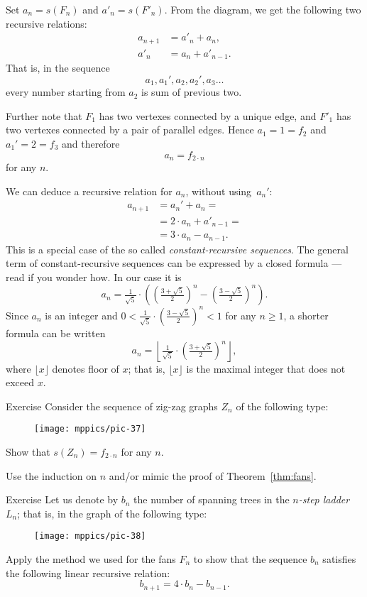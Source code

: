 Set $a_n=s(F_n)$ and $a'_n=s(F'_n)$.
From the diagram, we get the following two recursive relations:
\begin{align*}
a_{n+1}&=a'_n+a_n,
\\
a'_n&=a_n+a'_{n-1}.
\end{align*}
That is, in the sequence 
\[a_1,a_1',a_2,a_2',a_3\dots\]
every number starting from $a_2$ is sum of previous two.

Further note that $F_1$ has two vertexes connected by a unique edge,
and  $F'_1$ has two vertexes connected by a pair of parallel edges.
Hence $a_1=1=f_2$ and $a_1'=2=f_3$ and therefore 
\[a_n=f_{2\cdot n}\]
for any $n$.\qeds

We can deduce a recursive relation for $a_n$, without using~$a_n'$:
\begin{align*}
a_{n+1}&=a_n'+a_n=
\\
&=2\cdot a_n+a'_{n-1}=
\\
&=3\cdot a_n-a_{n-1}.
\end{align*}
This is a special case of the so called \emph{constant-recursive sequences}.
The general term of constant-recursive sequences can be expressed by a closed formula ---
read \cite{jordan} if you wonder how.
In our case it is
\[a_n=\tfrac1{\sqrt{5}}\cdot
\left(
(\tfrac{3+\sqrt{5}}2)^n-(\tfrac{3-\sqrt{5}}2)^n
\right).\]
Since $a_n$ is an integer and $0<\tfrac1{\sqrt{5}}\cdot(\tfrac{3-\sqrt{5}}2)^n<1$ for any $n\ge 1$, a shorter formula can be written
\[a_n
=
\left\lfloor\tfrac1{\sqrt{5}}\cdot(\tfrac{3+\sqrt{5}}2)^n\right\rfloor,\]
where $\lfloor x\rfloor$ denotes floor of $x$; 
that is, $\lfloor x\rfloor$ is the maximal integer that does not exceed $x$.

\begin{thm}{Exercise}
Consider the sequence of zig-zag graphs $Z_n$ of the following type:
\begin{figure}[h!]
\centering
\texttt{[image: mppics/pic-37]}
\end{figure}

Show that $s(Z_n)=f_{2\cdot n}$ for any $n$. 
\end{thm}

 Use the induction on $n$ and/or mimic the proof of Theorem~\ref{thm:fans}.


\begin{thm}{Exercise}
Let us denote by $b_n$ the number of spanning trees in the {}\emph{$n$-step ladder} $L_n$; that is, in the graph of the following type:

\begin{figure}[h!]
\centering
\texttt{[image: mppics/pic-38]}
\end{figure}

Apply the method we used for the fans $F_n$ to show that the sequence $b_n$ satisfies the following linear recursive relation:
\[b_{n+1}=4\cdot b_n-b_{n-1}.\]

\end{thm}


